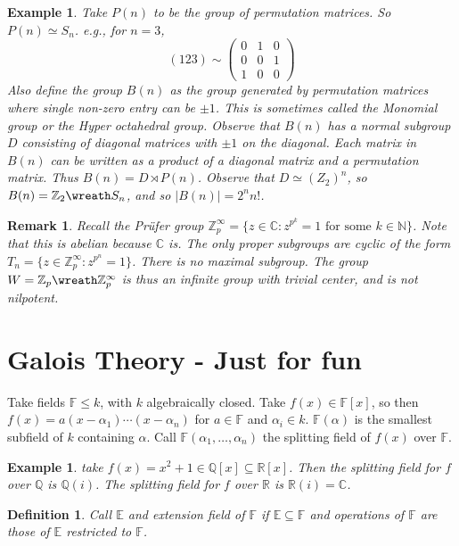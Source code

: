 \documentclass[a4paper,10pt]{article}
\newcommand{\CC}{\mathbb{C}}
\newcommand{\RR}{\mathbb{R}}
\newcommand{\NN}{\mathbb{N}}
\newcommand{\QQ}{\mathbb{Q}}
\newcommand{\ZZ}{\mathbb{Z}}
\newcommand{\EE}{\mathbb{E}}
\newcommand{\FF}{\mathbb{F}}
\newtheorem{Def}[thm]{Definition}
\newtheorem{eg}[thm]{Example}
\newtheorem{rem}[thm]{Remark}
\begin{document}
\begin{eg}
Take $P(n)$ to be the group of permutation matrices. So $P(n) \simeq S_n$. e.g., for $n = 3$, 
\[ (123) \sim \begin{pmatrix} 0 & 1 & 0 \\ 0 & 0 & 1 \\ 1 & 0 & 0 \end{pmatrix} \]
Also define the group $B(n)$ as the group generated by permutation matrices where single non-zero entry can be $\pm 1$. This is sometimes called the Monomial group or the Hyper octahedral group. Observe that $B(n)$ has a normal subgroup $D$ consisting of diagonal matrices with $\pm 1$ on the diagonal. Each matrix in $B(n)$ can be written as a product of a diagonal matrix and a permutation matrix. Thus $B(n) = D \rtimes P(n)$. Observe that $D \simeq (Z_2 )^n$, so $B(n) = \ZZ_2 \wreath S_n$, and so $|B(n)| = 2^n n!$.
\end{eg}

\begin{rem}
Recall the Pr\"{u}fer group $\ZZ_p^\infty = \{ z \in \CC : z^{p^k} = 1 \text{ for some } k \in \NN \}$. Note that this is abelian because $\CC$ is. The only proper subgroups are cyclic of the form $T_n = \{ z \in \ZZ_p^\infty : z^{p^n} = 1 \}$. There is no maximal subgroup. The group $W = \ZZ_p \wreath \ZZ_p^\infty$ is thus an infinite group with trivial center, and is not nilpotent. 
\end{rem}


\newpage
\section{Galois Theory - Just for fun}

Take fields $\FF \leq k$, with $k$ algebraically closed. Take $f(x) \in \FF[x]$, so then $f(x) = a (x - \alpha_1) \cdots (x - \alpha_n)$ for $a \in \FF$ and $\alpha_i \in k$. $\FF (\alpha)$ is the smallest subfield of $k$ containing $\alpha$. Call $\FF( \alpha_1, \dots, \alpha_n)$ the splitting field of $f(x)$ over $\FF$. 

\begin{eg}
take $f(x) = x^2 + 1 \in \QQ[x] \subseteq \RR[x]$. Then the splitting field for $f$ over $\QQ$ is $\QQ(i)$. The splitting field for $f$ over $\RR$ is $\RR(i) = \CC$. 
\end{eg}

\begin{Def}
Call $\EE$ and extension field of $\FF$ if $\EE \subseteq \FF$ and operations of $\FF$ are those of $\EE$ restricted to $\FF$. 
\end{Def}
\end{document}
